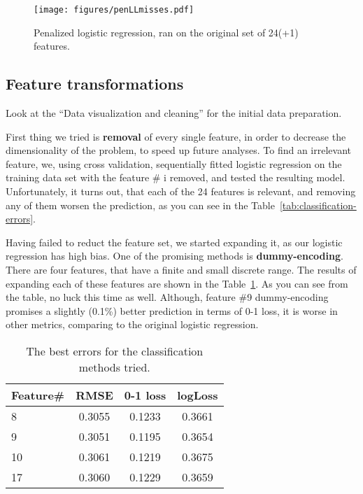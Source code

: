 \documentclass{article} %
\begin{document}
\begin{figure}[h]
\center
\texttt{[image: figures/penLLmisses.pdf]}
\caption{Penalized logistic regression, ran on the original set of 24(+1) features.}
\label{fig:penLLmisses}
\end{figure}

\subsection{Feature transformations}
Look at the ``Data visualization and cleaning'' for the initial data preparation.

First thing we tried is {\bf removal} of every single feature, in order to decrease the dimensionality of the problem, to speed up future analyses. To find an irrelevant feature, we, using cross validation, sequentially fitted logistic regression on the training data set with the feature \# i removed, and tested the resulting model. Unfortunately, it turns out, that each of the 24 features is relevant, and removing any of them worsen the prediction, as you can see in the Table~\ref{tab:classification-errors}.

Having failed to reduct the feature set, we started expanding it, as our logistic regression has high bias. One of the promising methods is {\bf dummy-encoding}. There are four features, that have a finite and small discrete range. The results of expanding each of these features are shown in the Table~\ref{tab:classification-dummy}. As you can see from the table, no luck this time as well. Although, feature \#9 dummy-encoding promises a slightly (0.1\%) better prediction in terms of 0-1 loss, it is worse in other metrics, comparing to the original logistic regression.
\begin{table}[h]
  \begin{center}
    \begin{tabular}{l|ccc}
      Feature\# & RMSE & 0-1 loss & logLoss \\
      \hline
      8 & 0.3055 & 0.1233 & 0.3661 \\
      9 & 0.3051 & 0.1195 & 0.3654 \\
      10 & 0.3061 & 0.1219 & 0.3675 \\
      17 & 0.3060 & 0.1229 & 0.3659
    \end{tabular}
    \caption{The best errors for the classification methods tried.}
    \label{tab:classification-dummy}
  \end{center}
\end{table}
\end{document}
